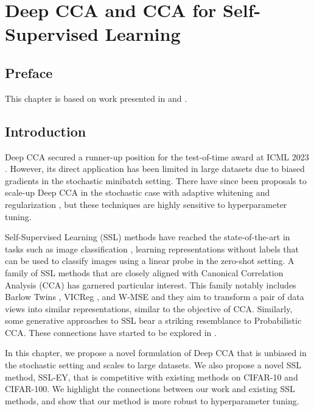 \graphicspath{{chapters/deep_learning/}}

\chapter{Deep CCA and CCA for Self-Supervised Learning}\label{ch:deep_learning}
\minitoc
\section*{Preface}

This chapter is based on work presented in \citet{chapman2023cca} and \citet{chapman2023efficient}.

\section{Introduction}

Deep CCA \citep{andrew2013deep} secured a runner-up position for the test-of-time award at ICML 2023 \citep{ICML2023TOT}.
However, its direct application has been limited in large datasets due to biased gradients in the stochastic minibatch setting.
There have since been proposals to scale-up Deep CCA in the stochastic case with adaptive whitening \citep{wang2015stochastic} and regularization \cite{chang2018scalable}, but these techniques are highly sensitive to hyperparameter tuning.

Self-Supervised Learning (SSL) methods have reached the state-of-the-art in tasks such as image classification \citep{balestriero2023cookbook}, learning representations without labels that can be used to classify images using a linear probe in the zero-shot setting.
A family of SSL methods that are closely aligned with Canonical Correlation Analysis (CCA) has garnered particular interest.
This family notably includes Barlow Twins \citep{zbontar2021barlow}, VICReg \citep{bardes2021vicreg}, and W-MSE \citep{ermolov2021whitening} and they aim to transform a pair of data views into similar representations, similar to the objective of CCA. Similarly, some generative approaches to SSL\cite{sansone2022gedi} bear a striking resemblance to Probabilistic CCA\cite{bach2005probabilistic}.
These connections have started to be explored in \cite{balestriero2022contrastive}.

In this chapter, we propose a novel formulation of Deep CCA that is unbiased in the stochastic setting and scales to large datasets.
We also propose a novel SSL method, SSL-EY, that is competitive with existing methods on CIFAR-10 and CIFAR-100.
We highlight the connections between our work and existing SSL methods, and show that our method is more robust to hyperparameter tuning.

